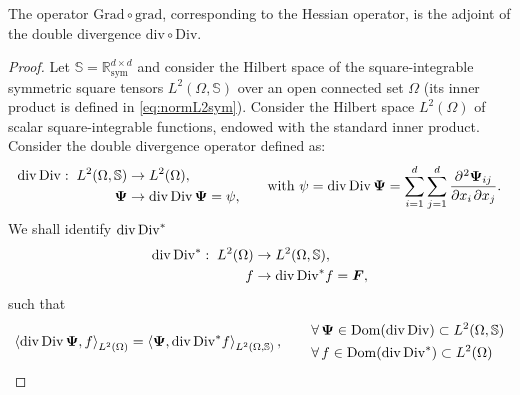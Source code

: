 \begin{theorem}
	The operator $\mathrm{Grad} \circ \mathrm{grad}$, corresponding to the Hessian operator, is the adjoint of the double divergence $\mathrm{div} \circ \mathrm{Div}$.
	\begin{proof}
		Let $\mathbb{S} = \mathbb{R}^{d \times d}_{\text{sym}}$ and consider the Hilbert space of the square-integrable symmetric square tensors  $L^2(\Omega, \mathbb{S})$ over an open connected set $\Omega$ (its inner product is defined in \eqref{eq:normL2sym}). 		Consider the Hilbert space $L^2(\Omega)$ of scalar square-integrable functions, endowed with the standard inner product. Consider the double divergence operator defined as: 
		\begin{equation*}
		\begin{aligned}
		\div\Div: \; L^2(\Omega, \mathbb{S})& \rightarrow L^2(\Omega), \\
		\bm{\Psi}& \rightarrow \div\Div \bm{\Psi} = \psi, \\	\end{aligned}
		\qquad \text{with } \psi = \div\Div \bm{\Psi} = \sum_{i = 1}^d \sum_{j = 1}^d \diffp{\bm{\Psi}_{ij}}{x_i,x_j}.
		\end{equation*}
		We {shall} identify ${\operatorname{div}\operatorname*{Div}}^*$
		\begin{equation*}
		\begin{aligned}
		{\operatorname{div}\operatorname*{Div}}^*: \; L^2(\Omega)& \rightarrow L^2(\Omega, \mathbb{S}), \\
		f& \rightarrow  {\operatorname{div}\operatorname*{Div}}^* f = \bm{F}, \\
		\end{aligned}
		\end{equation*}
		such that 
		\begin{equation*}
		\left\langle \operatorname{div}\operatorname*{Div} \bm{\Psi} , f \right\rangle_{L^2(\Omega)} = \left\langle \bm{\Psi} , {\operatorname{div}\operatorname*{Div}}^* f \right\rangle_{L^2(\Omega, \mathbb{S})},
		\begin{aligned} \qquad
		&\forall \,\bm{\Psi} \in \operatorname{Dom}(\operatorname{div}\operatorname*{Div}) \subset L^2(\Omega, \mathbb{S}) \\
		&\forall \,f \in \operatorname{Dom}({\operatorname{div}\operatorname*{Div}}^*) \subset L^2(\Omega)
		\end{aligned}
		\end{equation*}
		

\end{proof}
\end{theorem}
